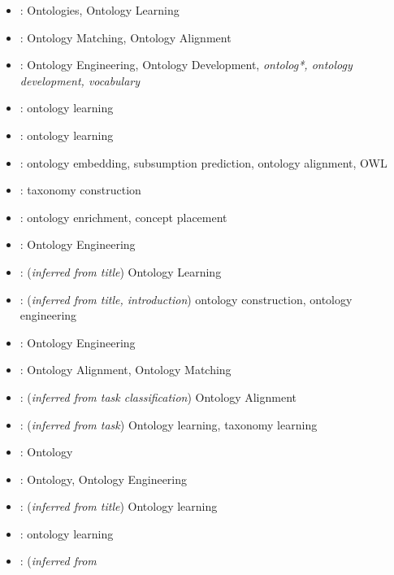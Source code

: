 \documentclass[a4paper,colorinlistoftodos]{article}
\begin{document}
\begin{itemize}
  \item \citet{babaei2023Llms4olLargeLanguage}: Ontologies, Ontology Learning
  \item \citet{babaei2025Llms4omMatchingOntologies}: Ontology Matching,
    Ontology Alignment
  \item \citet{li2025LargeLanguageModels}: Ontology Engineering, Ontology
    Development, \textit{ontolog*, ontology development,
    vocabulary}
  \item \citet{mai2024DoLlmsReally}: ontology learning
  \item \citet{bakker2024OntologyLearningText}: ontology learning
  \item \citet{chen2023ContextualSemanticEmbeddings}: ontology embedding,
    subsumption prediction, ontology alignment, OWL
  \item \citet{chen2023PromptingOrFine}: taxonomy construction
  \item \citet{dong2024LanguageModelBased}: ontology enrichment, concept
    placement
  \item \citet{doumanas2024IntegratingLlmsIn}: Ontology Engineering
  \item \citet{du2024ShortReviewOntology}: (\textit{inferred from title})
    Ontology Learning
  \item \citet{funk2023TowardsOntologyConstruction}: (\textit{inferred from
      title, introduction}) ontology construction, ontology engineering
  \item \citet{garijo2024LlmsOntologyEngineering}: Ontology Engineering
  \item \citet{he2023ExploringLargeLanguage}: Ontology Alignment, Ontology
    Matching 
  \item \citet{he2023LanguageModelAnalysis}: (\textit{inferred from task
      classification}) Ontology Alignment
  \item \citet{jain2022DistillingHypernymyRelations}: (\textit{inferred from
      task}) Ontology learning, taxonomy learning
  \item \citet{kommineni2024HumanExpertsMachines}: Ontology
  \item \citet{lippolis2025OntologyGenerationUsing}: Ontology, Ontology
    Engineering
  \item \citet{lo2024EndEndOntology}: (\textit{inferred from title}) Ontology
    learning
  \item \citet{mai2024DoLlmsReally}: ontology learning
  \item \citet{mateiu2023OntologyEngineeringWith}: (\textit{inferred from
}
\end{itemize}
\end{document}
